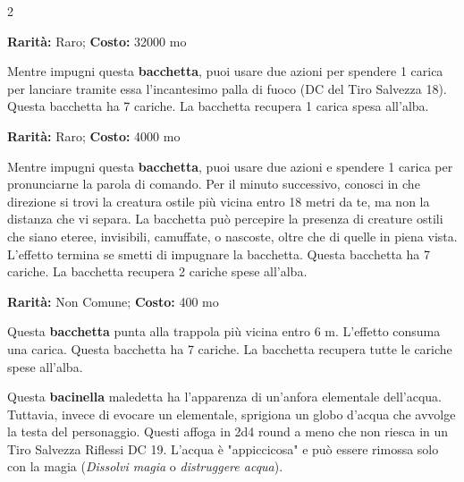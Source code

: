 \begin{multicols}{2}





\textbf{Rarità:} Raro; \textbf{Costo:} 32000 mo

Mentre impugni questa \textbf{bacchetta}, puoi usare due azioni per spendere 1 carica per lanciare tramite essa l'incantesimo palla di fuoco (DC del Tiro Salvezza 18). Questa bacchetta ha 7 cariche. La bacchetta recupera 1 carica spesa all'alba.


\textbf{Rarità:} Raro; \textbf{Costo:} 4000 mo

Mentre impugni questa \textbf{bacchetta}, puoi usare due azioni e spendere 1 carica per pronunciarne la parola di comando. Per il minuto successivo, conosci in che direzione si trovi la creatura ostile più vicina entro 18 metri da te, ma non la distanza che vi separa. La bacchetta può percepire la presenza di creature ostili che siano eteree, invisibili, camuffate, o nascoste, oltre che di quelle in piena vista. L'effetto termina se smetti di impugnare la bacchetta. Questa bacchetta ha 7 cariche. La bacchetta recupera 2 cariche spese all'alba.


\textbf{Rarità:} Non Comune; \textbf{Costo:} 400 mo

Questa \textbf{bacchetta} punta alla trappola più vicina entro 6 m. L'effetto consuma una carica. Questa bacchetta ha 7 cariche. La bacchetta recupera tutte le cariche spese all'alba.


Questa \textbf{bacinella} maledetta ha l'apparenza di un'anfora elementale dell'acqua. Tuttavia, invece di evocare un elementale, sprigiona un globo d'acqua che avvolge la testa del personaggio. Questi affoga in 2d4 round a meno che non riesca in un Tiro Salvezza Riflessi DC 19. L'acqua è "appiccicosa" e può essere rimossa solo con la magia (\emph{Dissolvi magia} o \emph{distruggere acqua}).



\end{multicols}
